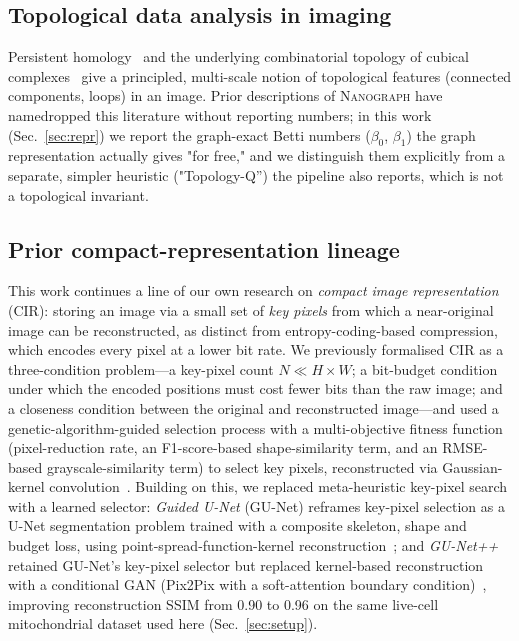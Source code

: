 \documentclass[10pt,a4paper]{article}
\newcommand{\method}{\textnormal{\textsc{Nanograph}}\xspace}
\begin{document}
\subsection{Topological data analysis in imaging}
Persistent homology~\cite{persistenthomology} and the underlying combinatorial
topology of cubical complexes~\cite{edelsbrunner2010computational} give a
principled, multi-scale notion of topological features (connected components,
loops) in an image. Prior descriptions of \method have namedropped this
literature without reporting numbers; in this work
(Sec.~\ref{sec:repr}) we report the graph-exact Betti numbers ($\beta_0$,
$\beta_1$) the graph representation actually gives "for free," and we
distinguish them explicitly from a separate, simpler heuristic
("Topology-Q'') the pipeline also reports, which is not a topological
invariant.

\subsection{Prior compact-representation lineage}
\label{sec:lineage}
This work continues a line of our own research on \emph{compact image
representation} (CIR): storing an image via a small set of \emph{key pixels}
from which a near-original image can be reconstructed, as distinct from
entropy-coding-based compression, which encodes every pixel at a lower bit
rate. We previously formalised CIR as a three-condition problem---a key-pixel
count $N \ll H\times W$; a bit-budget condition under which the encoded
positions must cost fewer bits than the raw image; and a closeness condition
between the original and reconstructed image---and used a
genetic-algorithm-guided selection process with a multi-objective fitness
function (pixel-reduction rate, an F1-score-based shape-similarity term, and
an RMSE-based grayscale-similarity term) to select key pixels, reconstructed
via Gaussian-kernel convolution~\cite{malakar2025eaai}. Building on this, we
replaced meta-heuristic key-pixel search with a learned selector:
\emph{Guided U-Net} (GU-Net) reframes key-pixel selection as a U-Net
segmentation problem trained with a composite skeleton, shape and budget
loss, using point-spread-function-kernel
reconstruction~\cite{banerjee2023acpr}; and \emph{GU-Net++} retained GU-Net's
key-pixel selector but replaced kernel-based reconstruction with a
conditional GAN (Pix2Pix with a soft-attention boundary
condition)~\cite{banerjee2024gunetpp}, improving reconstruction SSIM from
0.90 to 0.96 on the same live-cell mitochondrial dataset used here
(Sec.~\ref{sec:setup}).
\end{document}
